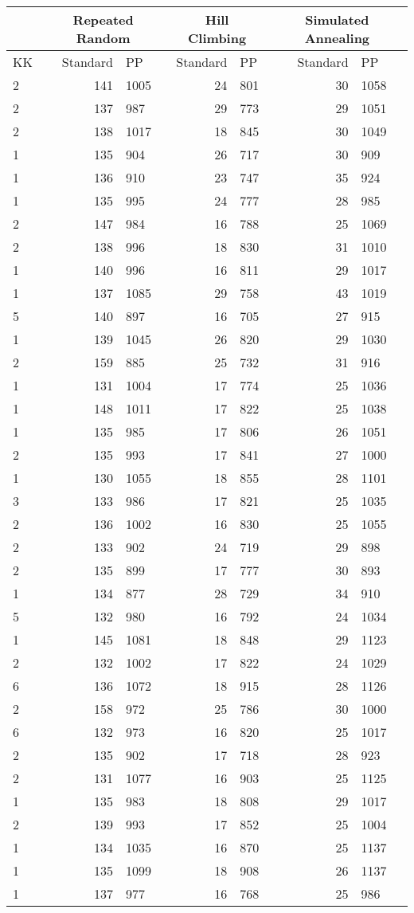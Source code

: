 \documentclass[11pt]{article}
\begin{document}
\begin{tabular}{l r l r l r l}
 & \multicolumn{2}{c}{Repeated Random} & \multicolumn{2}{c}{Hill Climbing} & \multicolumn{2}{c}{Simulated Annealing} \\ \hline
KK & Standard & PP & Standard & PP & Standard & PP \\ \hline
2 & 141 & 1005 & 24 & 801 & 30 & 1058 \\ 
2 & 137 & 987 & 29 & 773 & 29 & 1051 \\ 
2 & 138 & 1017 & 18 & 845 & 30 & 1049 \\ 
1 & 135 & 904 & 26 & 717 & 30 & 909 \\ 
1 & 136 & 910 & 23 & 747 & 35 & 924 \\ 
1 & 135 & 995 & 24 & 777 & 28 & 985 \\ 
2 & 147 & 984 & 16 & 788 & 25 & 1069 \\ 
2 & 138 & 996 & 18 & 830 & 31 & 1010 \\ 
1 & 140 & 996 & 16 & 811 & 29 & 1017 \\ 
1 & 137 & 1085 & 29 & 758 & 43 & 1019 \\ 
5 & 140 & 897 & 16 & 705 & 27 & 915 \\ 
1 & 139 & 1045 & 26 & 820 & 29 & 1030 \\ 
2 & 159 & 885 & 25 & 732 & 31 & 916 \\ 
1 & 131 & 1004 & 17 & 774 & 25 & 1036 \\ 
1 & 148 & 1011 & 17 & 822 & 25 & 1038 \\ 
1 & 135 & 985 & 17 & 806 & 26 & 1051 \\ 
2 & 135 & 993 & 17 & 841 & 27 & 1000 \\ 
1 & 130 & 1055 & 18 & 855 & 28 & 1101 \\ 
3 & 133 & 986 & 17 & 821 & 25 & 1035 \\ 
2 & 136 & 1002 & 16 & 830 & 25 & 1055 \\ 
2 & 133 & 902 & 24 & 719 & 29 & 898 \\ 
2 & 135 & 899 & 17 & 777 & 30 & 893 \\ 
1 & 134 & 877 & 28 & 729 & 34 & 910 \\ 
5 & 132 & 980 & 16 & 792 & 24 & 1034 \\ 
1 & 145 & 1081 & 18 & 848 & 29 & 1123 \\ 
2 & 132 & 1002 & 17 & 822 & 24 & 1029 \\ 
6 & 136 & 1072 & 18 & 915 & 28 & 1126 \\ 
2 & 158 & 972 & 25 & 786 & 30 & 1000 \\ 
6 & 132 & 973 & 16 & 820 & 25 & 1017 \\ 
2 & 135 & 902 & 17 & 718 & 28 & 923 \\ 
2 & 131 & 1077 & 16 & 903 & 25 & 1125 \\ 
1 & 135 & 983 & 18 & 808 & 29 & 1017 \\ 
2 & 139 & 993 & 17 & 852 & 25 & 1004 \\ 
1 & 134 & 1035 & 16 & 870 & 25 & 1137 \\ 
1 & 135 & 1099 & 18 & 908 & 26 & 1137 \\ 
1 & 137 & 977 & 16 & 768 & 25 & 986 \\
\end{tabular}
\end{document}
